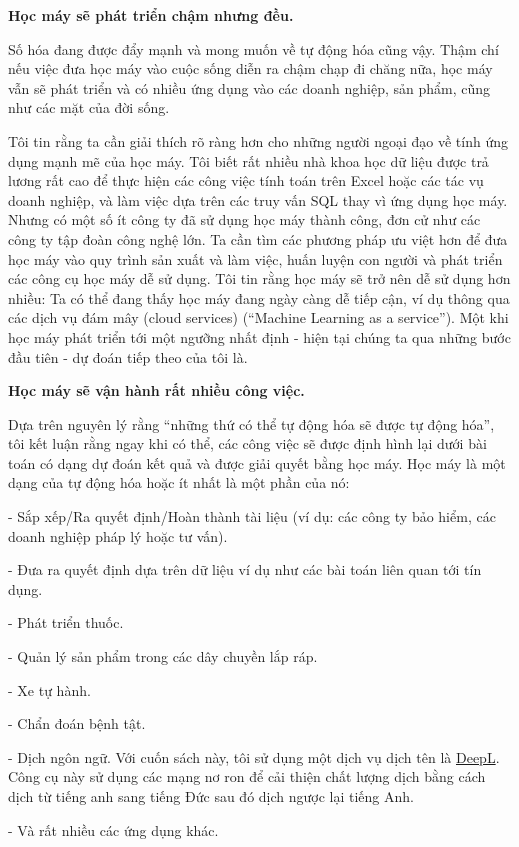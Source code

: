 \textbf{Học máy sẽ phát triển chậm nhưng đều.}

Số hóa đang được đẩy mạnh và mong muốn về tự động hóa cũng vậy. Thậm chí nếu việc đưa học máy vào cuộc sống diễn ra chậm chạp đi chăng nữa, học máy vẫn sẽ phát triển và có nhiều ứng dụng vào các doanh nghiệp, sản phẩm, cũng như các mặt của đời sống.

Tôi tin rằng ta cần giải thích rõ ràng hơn cho những người ngoại đạo về tính ứng dụng mạnh mẽ của học máy. Tôi biết rất nhiều nhà khoa học dữ liệu được trả lương rất cao để thực hiện các công việc tính toán trên Excel hoặc các tác vụ doanh nghiệp, và làm việc dựa trên các truy vấn SQL thay vì ứng dụng học máy. Nhưng có một số ít công ty đã sử dụng học máy thành công, đơn cử như các công ty tập đoàn công nghệ lớn. Ta cần tìm các phương pháp ưu việt hơn để đưa học máy vào quy trình sản xuất và làm việc, huấn luyện con người và phát triển các công cụ học máy dễ sử dụng. Tôi tin rằng học máy sẽ trở nên dễ sử dụng hơn nhiều: Ta có thể đang thấy học máy đang ngày càng dễ tiếp cận, ví dụ thông qua các dịch vụ đám mây (cloud services) (``Machine Learning as a service''). Một khi học máy phát triển tới một ngưỡng nhất định - hiện tại chúng ta qua những bước đầu tiên - dự đoán tiếp theo của tôi là.

\textbf{Học máy sẽ vận hành rất nhiều công việc.}

Dựa trên nguyên lý rằng ``những thứ có thể tự động hóa sẽ được tự động hóa'', tôi kết luận rằng ngay khi có thể, các công việc sẽ được định hình lại dưới bài toán có dạng dự đoán kết quả và được giải quyết bằng học máy. Học máy là một dạng của tự động hóa hoặc ít nhất là một phần của nó:

- Sắp xếp/Ra quyết định/Hoàn thành tài liệu (ví dụ: các công ty bảo hiểm, các doanh nghiệp pháp lý hoặc tư vấn).

- Đưa ra quyết định dựa trên dữ liệu ví dụ như các bài toán liên quan tới tín dụng.

- Phát triển thuốc.

- Quản lý sản phẩm trong các dây chuyền lắp ráp.

- Xe tự hành.

- Chẩn đoán bệnh tật.

- Dịch ngôn ngữ. Với cuốn sách này, tôi sử dụng một dịch vụ dịch tên là \href{https://deepl.com/}{DeepL}. Công cụ này sử dụng các mạng nơ ron để cải thiện chất lượng dịch bằng cách dịch từ tiếng anh sang tiếng Đức sau đó dịch ngược lại tiếng Anh.

- Và rất nhiều các ứng dụng khác.

